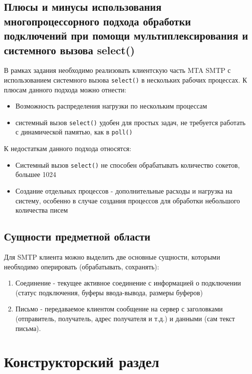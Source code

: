 \documentclass[a4paper,12pt]{report}
\begin{document}
\section{Плюсы и минусы использования многопроцессорного подхода обработки подключений при помощи мультиплексирования и системного вызова select()}

В рамках задания необходимо реализовать клиентскую часть MTA SMTP с использованием системного вызова \texttt{select()} в нескольких рабочих процессах. К плюсам данного подхода можно отнести:
\begin{itemize}
    \item Возможность распределения нагрузки по нескольким процессам
    \item системный вызов \texttt{select()} удобен для простых задач, не требуется работать с динамической памятью, как в  \texttt{poll()}
\end{itemize}

К недостаткам данного подхода относятся:
\begin{itemize}
    \item Системный вызов \texttt{select()} не способен обрабатывать количество сокетов, большее 1024
    \item Создание отдельных процессов - дополнительные расходы и нагрузка на систему, особенно в случае создания процессов для обработки небольшого количества писем
\end{itemize}


\section{Сущности предметной области}

Для SMTP клиента можно выделить две основные сущности, которыми необходимо оперировать (обрабатывать, сохранять):
\begin{enumerate}
    \item Соединение - текущее активное соединение с информацией о подключении (статус подключения, буферы ввода-вывода, размеры буферов)
    \item Письмо - передаваемое клиентом сообщение на сервер с заголовками (отправитель, получатель, адрес получателя и т.д.) и данными (сам текст письма).
\end{enumerate}


\chapter{Конструкторский раздел}
\end{document}
